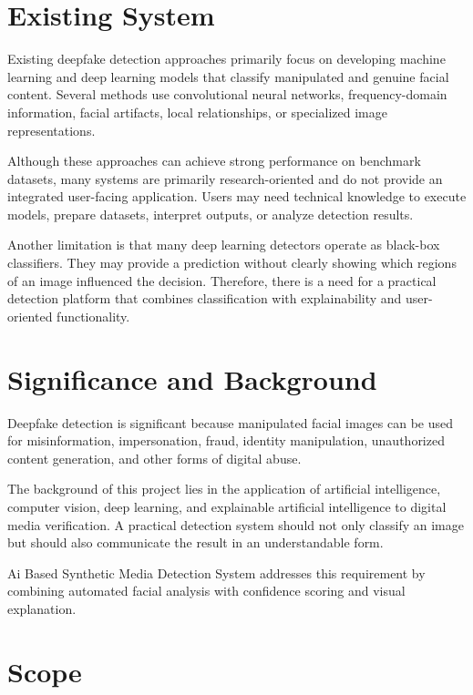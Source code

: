 \documentclass[12pt,a4paper,oneside]{report}
\begin{document}
\section{Existing System}

Existing deepfake detection approaches primarily focus on developing machine learning and deep learning models that classify manipulated and genuine facial content. Several methods use convolutional neural networks, frequency-domain information, facial artifacts, local relationships, or specialized image representations.

Although these approaches can achieve strong performance on benchmark datasets, many systems are primarily research-oriented and do not provide an integrated user-facing application. Users may need technical knowledge to execute models, prepare datasets, interpret outputs, or analyze detection results.

Another limitation is that many deep learning detectors operate as black-box classifiers. They may provide a prediction without clearly showing which regions of an image influenced the decision. Therefore, there is a need for a practical detection platform that combines classification with explainability and user-oriented functionality.

\section{Significance and Background}

Deepfake detection is significant because manipulated facial images can be used for misinformation, impersonation, fraud, identity manipulation, unauthorized content generation, and other forms of digital abuse.

The background of this project lies in the application of artificial intelligence, computer vision, deep learning, and explainable artificial intelligence to digital media verification. A practical detection system should not only classify an image but should also communicate the result in an understandable form.

Ai Based Synthetic Media Detection System addresses this requirement by combining automated facial analysis with confidence scoring and visual explanation.

\section{Scope}
\end{document}
